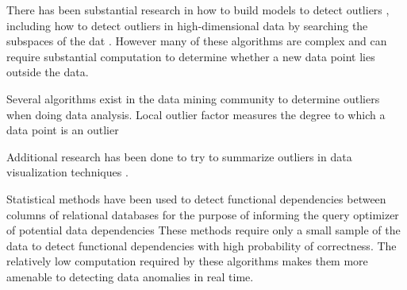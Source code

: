 
There has been substantial research in how to build models to detect outliers \cite{Aggarwal2013}, including how to detect outliers in high-dimensional data by searching the subspaces of the dat \cite{Zhang2004}\cite{Kriegel2009}.
However many of these algorithms are complex and can require substantial computation to determine whether a new data point lies outside the data.

Several algorithms exist in the data mining community to determine outliers when doing data analysis.
Local outlier factor measures the degree to which a data point is an outlier

Additional research has been done to try to summarize outliers in data visualization techniques \cite{Wu}.

Statistical methods have been used to detect functional dependencies between columns of relational databases for the purpose of informing the query optimizer of potential data dependencies \cite{Ilyas2004} 
These methods require only a small sample of the data to detect functional dependencies with high probability of correctness.
The relatively low computation required by these algorithms makes them more amenable to detecting data anomalies in real time.



